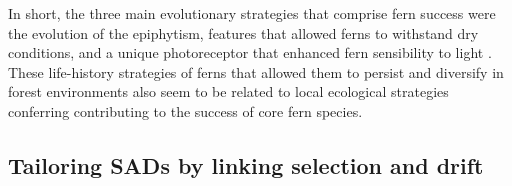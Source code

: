 \documentclass[12pt]{article}
\begin{document}
In short, the three main evolutionary strategies
that comprise fern success%
were the 
evolution of the epiphytism, features that
allowed ferns to withstand dry conditions, and a unique photoreceptor
that enhanced fern sensibility to light \citep{Schneider2004,
  Schuettpelz2009}. These life-history strategies of ferns that
allowed them to persist and diversify in forest environments also seem
to be related to local ecological strategies conferring contributing
to the success of core fern species.


\subsection*{Tailoring SADs by linking selection and drift}
\end{document}
